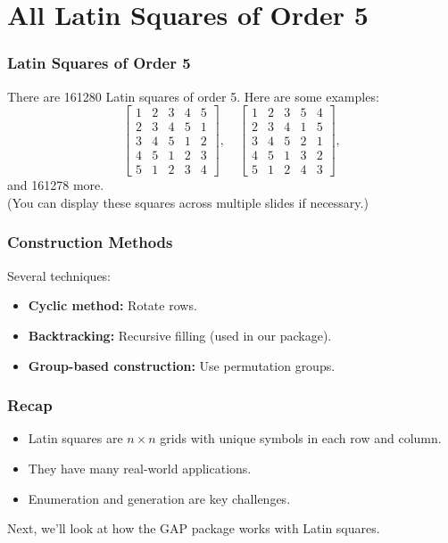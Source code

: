 \documentclass{beamer}
\begin{document}
\section{All Latin Squares of Order 5}
\begin{frame}
\frametitle{Latin Squares of Order 5}
There are 161280 Latin squares of order 5. Here are some examples:
\[
\begin{bmatrix}
1 & 2 & 3 & 4 & 5 \\
2 & 3 & 4 & 5 & 1 \\
3 & 4 & 5 & 1 & 2 \\
4 & 5 & 1 & 2 & 3 \\
5 & 1 & 2 & 3 & 4
\end{bmatrix},
\quad
\begin{bmatrix}
1 & 2 & 3 & 5 & 4 \\
2 & 3 & 4 & 1 & 5 \\
3 & 4 & 5 & 2 & 1 \\
4 & 5 & 1 & 3 & 2 \\
5 & 1 & 2 & 4 & 3
\end{bmatrix},
\]
and 161278 more.\\
(You can display these squares across multiple slides if necessary.)
\end{frame}

\begin{frame}
\frametitle{Construction Methods}
Several techniques:
\begin{itemize}
  \item \textbf{Cyclic method:} Rotate rows.
  \item \textbf{Backtracking:} Recursive filling (used in our package).
  \item \textbf{Group-based construction:} Use permutation groups.
\end{itemize}
\end{frame}

\begin{frame}
\frametitle{Recap}
\begin{itemize}
  \item Latin squares are $n \times n$ grids with unique symbols in each row and column.
  \item They have many real-world applications.
  \item Enumeration and generation are key challenges.
\end{itemize}
Next, we'll look at how the GAP package works with Latin squares.
\end{frame}
\end{document}
